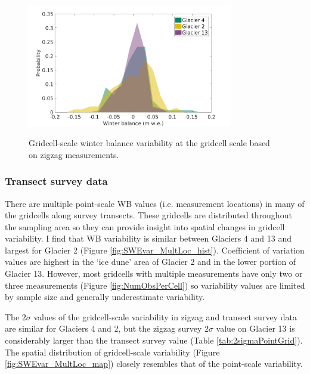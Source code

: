 \documentclass{sfuthesis}
\begin{document}
\begin{figure}
	\centering
	\includegraphics[width =0.8\textwidth]{ZigzagPDF_G.png}\\
	\caption{Gridcell-scale winter balance variability at the gridcell scale based on zigzag measurements.}
	\label{fig:SWEvar_ZZG_hist}
\end{figure}

\subsubsection{Transect survey data}
There are multiple point-scale WB values (i.e. measurement locations) in many of the gridcells along survey transects. These gridcells are distributed throughout the sampling area so they can provide insight into spatial changes in gridcell variability. I find that WB variability is similar between Glaciers 4 and 13 and largest for Glacier 2 (Figure \ref{fig:SWEvar_MultLoc_hist}). Coefficient of variation values are highest in the `ice dune' area of Glacier 2 and in the lower portion of Glacier 13.  However, most gridcells with multiple measurements have only two or three measurements (Figure \ref{fig:NumObsPerCell}) so variability values are limited by sample size and generally underestimate variability. 

The $2\sigma$ values of the gridcell-scale variability in zigzag and transect survey data are similar for Glaciers 4 and 2, but the zigzag survey $2\sigma$ value on Glacier 13 is considerably larger than the transect survey value (Table  \ref{tab:2sigmaPointGrid}). The spatial distribution of gridcell-scale variability (Figure \ref{fig:SWEvar_MultLoc_map}) closely resembles that of the point-scale variability. 
\end{document}
